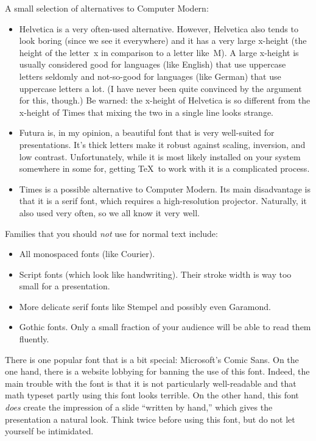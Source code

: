 A small selection of alternatives to Computer Modern:
\begin{itemize}
\item
  Helvetica is a very often-used alternative. However, Helvetica also
  tends to look boring (since we see it everywhere) and it has a very
  large x-height (the height of the letter~x in comparison to a letter
  like~M). A large x-height is usually considered good for languages
  (like English) that use uppercase letters seldomly and not-so-good
  for languages (like German) that use uppercase letters a lot. (I
  have never been quite convinced by the argument for this, though.)
  Be warned: the x-height of Helvetica is so different from the
  x-height of Times that mixing the two in a single line looks
  strange.
\item
  Futura is, in my opinion, a beautiful font that is very well-suited
  for presentations. It's thick letters make it robust against
  scaling, inversion, and low contrast. Unfortunately, while it is
  most likely installed on your system somewhere in some for, getting
  \TeX\ to work with it is a complicated process.
\item
  Times is a possible alternative to Computer Modern. Its main
  disadvantage is that it is a serif font, which requires a
  high-resolution projector. Naturally, it also used very often, so we
  all know it very well.
\end{itemize}

Families that you should \emph{not} use for normal text include:
\begin{itemize}
\item
  All monospaced fonts (like Courier).
\item
  Script fonts (which look like handwriting). Their stroke width is
  way too small for a presentation.
\item
  More delicate serif fonts like Stempel and possibly even Garamond.
\item
  Gothic fonts. Only a small fraction of your audience will be able to
  read them fluently. 
\end{itemize}

There is one popular font that is a bit special: Microsoft's Comic
Sans. On the one hand, there is a website lobbying for banning the use
of this font. Indeed, the main trouble with the font is that it is not
particularly well-readable and that math typeset partly using this
font looks terrible. On the other hand, this font \emph{does} create
the impression of a slide ``written by hand,'' which gives the
presentation a natural look. Think twice before using this font, but
do not let yourself be intimidated.


